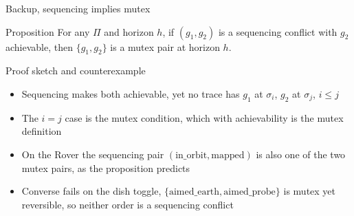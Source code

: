 \begin{frame}[noframenumbering]{Backup, sequencing implies mutex}
    \hypertarget{bk:seq-implies-mx}{}
    \begin{exampleblock}{Proposition}
        For any $\Pi$ and horizon $h$, if $(g_1, g_2)$ is a sequencing conflict with $g_2$ achievable, then $\{g_1, g_2\}$ is a mutex pair at horizon $h$.
    \end{exampleblock}

    \begin{block}{Proof sketch and counterexample}
        \begin{itemize}
            \item Sequencing makes both achievable, yet no trace has $g_1$ at $\sigma_i$, $g_2$ at $\sigma_j$, $i \leq j$
            \item The $i = j$ case is the mutex condition, which with achievability is the mutex definition
            \item On the Rover the sequencing pair $(\text{in\_orbit}, \text{mapped})$ is also one of the two mutex pairs, as the proposition predicts
            \item Converse fails on the dish toggle, $\{\text{aimed\_earth}, \text{aimed\_probe}\}$ is mutex yet reversible, so neither order is a sequencing conflict
        \end{itemize}
    \end{block}

\end{frame}

